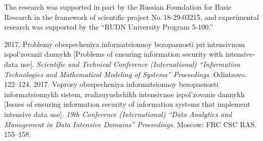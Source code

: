 
\vspace*{-12pt}

\Ack
\noindent
The research was supported in part by the Russian Foundation for Basic Research in the framework of 
scientific project No.\,18-29-03215, and experimental research was supported by the ``RUDN University 
Program 5-100.''



  \begin{multicols}{2}

\renewcommand{\bibname}{\protect\rmfamily References}

{\small\frenchspacing
 {%
 \begin{thebibliography}{99}
 
 2017. Problemy obespecheniya 
informatsionnoy bezopas\-nosti pri intensivnom ispol'zovanii dannykh [Problems of ensuring information 
security with intensive-data use]. \textit{Scientific and Technical Conference 
(International) ``Information Technologies and Mathematical Modeling of Systems'' Proceedings}. 
Odintsovo. 122--124.
 2017. 
Voprosy obespecheniya informatsionnoy bezopasnosti informatsionnykh sistem, re\-a\-li\-zu\-yushchikh 
intensivnoe ispol'zovanie dannykh [Issues of ensuring information security of information systems that 
implement intensive data use]. \textit{19th Conference (International) ``Data 
Analytics and Management in Data Intensive Domains'' Proceedings}. Moscow: FRC CSC RAS. 155--158.



\end{thebibliography}}}
\end{multicols}
